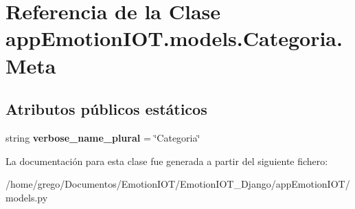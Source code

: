 \hypertarget{classappEmotionIOT_1_1models_1_1Categoria_1_1Meta}{}\section{Referencia de la Clase app\+Emotion\+I\+O\+T.\+models.\+Categoria.\+Meta}
\label{classappEmotionIOT_1_1models_1_1Categoria_1_1Meta}
\subsection*{Atributos públicos estáticos}
\begin{DoxyCompactItemize}
\item 
string {\bfseries verbose\+\_\+name\+\_\+plural} = \char`\"{}Categoria\char`\"{}\hypertarget{classappEmotionIOT_1_1models_1_1Categoria_1_1Meta_a8845639b8f96cd2cee4c441d937fd05b}{}\label{classappEmotionIOT_1_1models_1_1Categoria_1_1Meta_a8845639b8f96cd2cee4c441d937fd05b}

\end{DoxyCompactItemize}


La documentación para esta clase fue generada a partir del siguiente fichero\+:\begin{DoxyCompactItemize}
\item 
/home/grego/\+Documentos/\+Emotion\+I\+O\+T/\+Emotion\+I\+O\+T\+\_\+\+Django/app\+Emotion\+I\+O\+T/models.\+py\end{DoxyCompactItemize}
